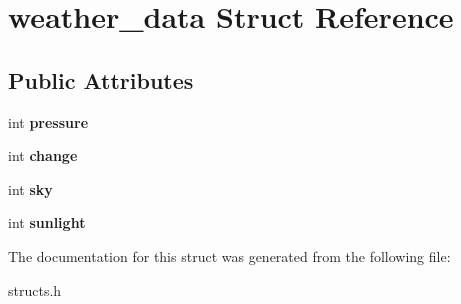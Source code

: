 \hypertarget{structweather__data}{}\section{weather\+\_\+data Struct Reference}
\label{structweather__data}
\subsection*{Public Attributes}
\begin{DoxyCompactItemize}
\item 
\mbox{\label{structweather__data_aa77b433509c3b110367d5f78a3144b97}} 
int {\bfseries pressure}
\item 
\mbox{\label{structweather__data_a2a76f35c40fd46f1c02adf10b002070b}} 
int {\bfseries change}
\item 
\mbox{\label{structweather__data_a59e908958e697d88c176d0e3474e46c3}} 
int {\bfseries sky}
\item 
\mbox{\label{structweather__data_a9ab25d9057a1923217380ca0f9d4e4a2}} 
int {\bfseries sunlight}
\end{DoxyCompactItemize}


The documentation for this struct was generated from the following file\+:\begin{DoxyCompactItemize}
\item 
structs.\+h\end{DoxyCompactItemize}
